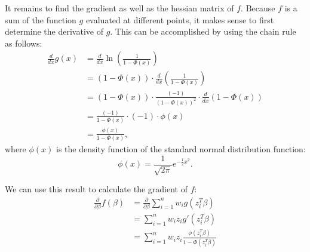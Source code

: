 It remains to find the gradient as well as the hessian matrix of $f$.
Because $f$ is a sum of the function $g$ evaluated at different points,
it makes sense to first determine the derivative of $g$.
This can be accomplished by using the chain rule as follows:
\begin{equation}
    \begin{split}
        \frac{d}{dx}g(x)
        & = \frac{d}{dx} \ln \left(\frac{1}{1 - \Phi(x)}\right)                 \\
        & = (1 - \Phi(x)) \cdot \frac{d}{dx} \left(\frac{1}{1 - \Phi(x)}\right) \\
        & = (1 - \Phi(x)) \cdot \frac{(-1)}{(1 - \Phi(x))^2} \cdot \frac{d}{dx} (1 - \Phi(x)) \\
        & = \frac{(-1)}{1 - \Phi(x)} \cdot (-1) \cdot \phi(x) \\
        & = \frac{\phi(x)}{1 - \Phi(x)},
    \end{split}
\end{equation}
where $\phi(x)$ is the density function of the standard normal distribution function:
\begin{equation*}
    \phi(x) = \frac{1}{\sqrt{2 \pi}} e^{-\frac{1}{2} x^2}.
\end{equation*}

\noindent We can use this result to calculate the gradient of $f$:
\begin{equation}
    \begin{split}
        \frac{\partial}{\partial \beta} f(\beta)
        & = \frac{\partial}{\partial \beta} \sum_{i=1}^n w_i g(z_i^T \beta) \\
        & = \sum_{i=1}^n w_i z_i g'(z_i^T \beta) \\
        & = \sum_{i=1}^n w_i z_i \frac{\phi(z_i^T \beta)}{1 - \Phi(z_i^T \beta)}
    \end{split}
\end{equation}

